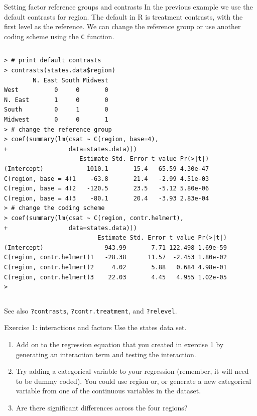 \documentclass[table,smaller]{beamer}
\begin{document}
\begin{frame}[fragile,label=sec-3-3]{Setting factor reference groups and contrasts}
 In the previous example we use the default contrasts for region. The default in R is treatment contrasts, with the first level as the reference. We can change the reference group or use another coding scheme using the \texttt{C} function.

\vspace{-.5em}
\begin{columns}
\begin{block}{}
\begin{verbatim}
> # print default contrasts
> contrasts(states.data$region)
        N. East South Midwest
West          0     0       0
N. East       1     0       0
South         0     1       0
Midwest       0     0       1
> # change the reference group
> coef(summary(lm(csat ~ C(region, base=4),
+                 data=states.data)))
                     Estimate Std. Error t value Pr(>|t|)
(Intercept)            1010.1       15.4   65.59 4.30e-47
C(region, base = 4)1    -63.8       21.4   -2.99 4.51e-03
C(region, base = 4)2   -120.5       23.5   -5.12 5.80e-06
C(region, base = 4)3    -80.1       20.4   -3.93 2.83e-04
> # change the coding scheme
> coef(summary(lm(csat ~ C(region, contr.helmert),
+                 data=states.data)))
                          Estimate Std. Error t value Pr(>|t|)
(Intercept)                 943.99       7.71 122.498 1.69e-59
C(region, contr.helmert)1   -28.38      11.57  -2.453 1.80e-02
C(region, contr.helmert)2     4.02       5.88   0.684 4.98e-01
C(region, contr.helmert)3    22.03       4.45   4.955 1.02e-05
>
\end{verbatim}
\end{block}
\end{columns}
\vspace{.5em}

See also \texttt{?contrasts}, \texttt{?contr.treatment}, and \texttt{?relevel}.
\end{frame}

\begin{frame}[label=sec-3-4]{Exercise 1: interactions and factors}
Use the states data set.

\begin{enumerate}
\item Add on to the regression equation that you created in exercise 1 by generating an interaction term and testing the interaction.
\item Try adding a categorical variable to your regression (remember, it will need to be dummy coded).  You could use region or, or generate a new categorical variable from one of the continuous variables in the dataset.
\item Are there significant differences across the four regions?
\end{enumerate}
\end{frame}
\end{document}
